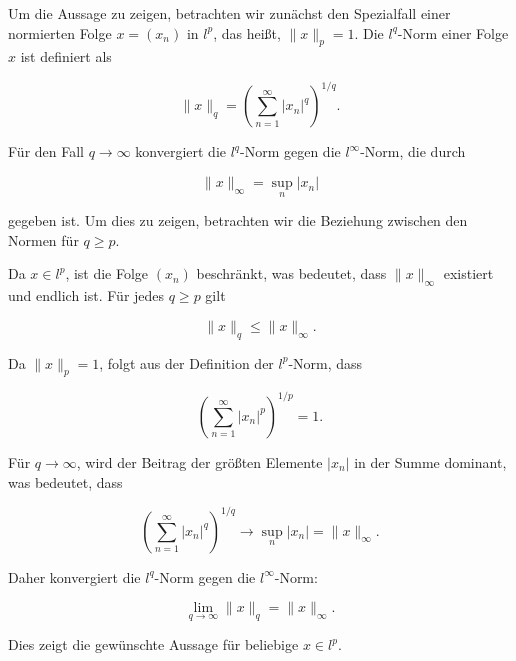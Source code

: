Um die Aussage zu zeigen, betrachten wir zunächst den Spezialfall einer normierten Folge \( x = (x_n) \) in \( l^p \), das heißt, \( \|x\|_p = 1 \). Die \( l^q \)-Norm einer Folge \( x \) ist definiert als 

\[
\|x\|_q = \left( \sum_{n=1}^{\infty} |x_n|^q \right)^{1/q}.
\]

Für den Fall \( q \to \infty \) konvergiert die \( l^q \)-Norm gegen die \( l^\infty \)-Norm, die durch 

\[
\|x\|_\infty = \sup_{n} |x_n|
\]

gegeben ist. Um dies zu zeigen, betrachten wir die Beziehung zwischen den Normen für \( q \geq p \).

Da \( x \in l^p \), ist die Folge \( (x_n) \) beschränkt, was bedeutet, dass \( \|x\|_\infty \) existiert und endlich ist. Für jedes \( q \geq p \) gilt 

\[
\|x\|_q \leq \|x\|_\infty.
\]

Da \( \|x\|_p = 1 \), folgt aus der Definition der \( l^p \)-Norm, dass 

\[
\left( \sum_{n=1}^{\infty} |x_n|^p \right)^{1/p} = 1.
\]

Für \( q \to \infty \), wird der Beitrag der größten Elemente \( |x_n| \) in der Summe dominant, was bedeutet, dass 

\[
\left( \sum_{n=1}^{\infty} |x_n|^q \right)^{1/q} \to \sup_{n} |x_n| = \|x\|_\infty.
\]

Daher konvergiert die \( l^q \)-Norm gegen die \( l^\infty \)-Norm:

\[
\lim_{q \to \infty} \|x\|_q = \|x\|_\infty.
\]

Dies zeigt die gewünschte Aussage für beliebige \( x \in l^p \).